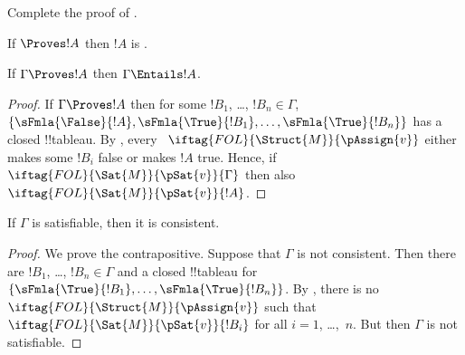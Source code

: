 \documentclass[../../../include/open-logic-section]{subfiles}
\begin{document}
\begin{prob}
Complete the proof of .
\end{prob}
\tagendprob

\begin{cor}
If $\Proves !A$ then $!A$ is .
\end{cor}

\begin{cor}
If $\Gamma \Proves !A$ then $\Gamma \Entails !A$.
\end{cor}

\begin{proof}
  If $\Gamma \Proves !A$ then for some $!B_1$, \dots, $!B_n \in
  \Gamma$, $\{\sFmla{\False}{!A}, \sFmla{\True}{!B_1}, \dots,
  \sFmla{\True}{!B_n}\}$ has a closed !!{tableau}. By
  , every
  ~$\iftag{FOL}{\Struct{M}}{\pAssign{v}}$
  either makes some $!B_i$ false or makes $!A$ true.  Hence, if
  $\iftag{FOL}{\Sat{M}}{\pSat{v}}{\Gamma}$ then also
  $\iftag{FOL}{\Sat{M}}{\pSat{v}}{!A}$.
\end{proof}

\begin{cor}
If $\Gamma$ is satisfiable, then it is consistent.
\end{cor}

\begin{proof}
We prove the contrapositive.  Suppose that $\Gamma$ is not consistent.
Then there are $!B_1$, \dots, $!B_n \in \Gamma$ and a closed
!!{tableau} for $\{\sFmla{\True}{!B_1}, \dots, \sFmla{\True}{!B_n}\}$.  By
, there is no
$\iftag{FOL}{\Struct{M}}{\pAssign{v}}$ such that
$\iftag{FOL}{\Sat{M}}{\pSat{v}}{!B_i}$ for all $i=1$, \dots,~$n$.  But
then $\Gamma$ is not satisfiable.
\end{proof}
\end{document}
